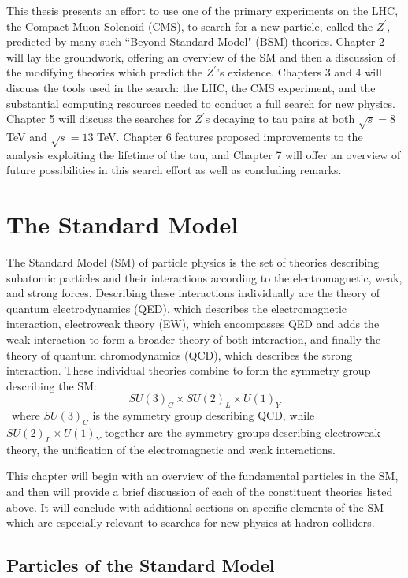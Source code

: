 This thesis presents an effort to use one of the primary experiments on the LHC, the Compact Muon Solenoid (CMS), to search for a new particle, called the \emph{$Z^\prime$}, predicted by many such ``Beyond Standard Model" (BSM) theories. Chapter 2 will lay the groundwork, offering an overview of the SM and then a discussion of the modifying theories which predict the $Z^\prime$'s existence. Chapters 3 and 4 will discuss the tools used in the search: the LHC, the CMS experiment, and the substantial computing resources needed to conduct a full search for new physics. Chapter 5 will discuss the searches for $Z^\prime$s decaying to tau pairs at both $\sqrt{s} = 8$ TeV and $\sqrt{s} = 13$ TeV. Chapter 6 features proposed improvements to the analysis exploiting the lifetime of the tau, and Chapter 7 will offer an overview of future possibilities in this search effort as well as concluding remarks.
\clearpage

\chapter{The Standard Model}


The Standard Model (SM) of particle physics is the set of theories describing subatomic particles and their interactions according to the electromagnetic, weak, and strong forces. Describing these interactions individually are the theory of quantum electrodynamics (QED), which describes the electromagnetic interaction, electroweak theory (EW), which encompasses QED and adds the weak interaction to form a broader theory of both interaction, and finally the theory of quantum chromodynamics (QCD), which describes the strong interaction. These individual theories combine to form the symmetry group describing the SM:
\begin{equation}
SU(3)_{C} \times SU(2)_{L} \times U(1)_{Y}
\end{equation}
\noindent\ where $SU(3)_{C}$ is the symmetry group describing QCD, while $SU(2)_{L} \times U(1)_{Y}$ together are the symmetry groups describing electroweak theory, the unification of the electromagnetic and weak interactions.

This chapter will begin with an overview of the fundamental particles in the SM, and then will provide a brief discussion of each of the constituent theories listed above. It will conclude with additional sections on specific elements of the SM which are especially relevant to searches for new physics at hadron colliders.

\section{Particles of the Standard Model}

